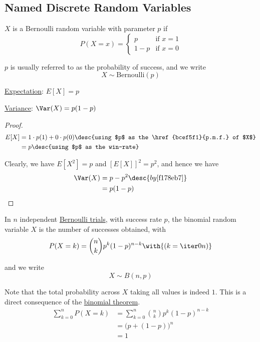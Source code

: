 \subsection{Named Discrete Random Variables}\label{ca86911}

\label{e2d50c6}

$X$ is a Bernoulli random variable with parameter $p$ if
$$
  P(X=x)=\begin{cases}
    p   & \text{if }x=1 \\
    1-p & \text{if }x=0
  \end{cases}
$$

$p$ is usually referred to as the probability of success, and we write
$$
  X\sim\mathrm{Bernoulli}(p)
$$

\label{e38c858}

\begin{enumerati}
  \item\href{ecb2162}{Expectation}: $E[X]=p$
  \item\href{ddd95d5}{Variance}: $\Var(X)=p(1-p)$
\end{enumerati}

\begin{proof}
  \begin{align*}
    E[X] &=1\cdot p(1)+0\cdot p(0)\desc{using $p$ as the \href{bcef5f1}{p.m.f.} of $X$} \\
         &=p\desc{using $p$ as the win-rate}
  \end{align*}

  Clearly, we have $E[X^2]=p$ and $[E[X]]^2=p^2$, and hence we have
  \begin{align*}
    \Var(X) &= p-p^2\desc{by \autoref{f178eb7}} \\
            &= p(1-p)
  \end{align*}
\end{proof}

\label{bc8d330}

In $n$ independent \href{e2d50c6}{Bernoulli trials}, with success rate $p$, the
binomial random variable $X$ is the number of successes obtained, with
$$
  P(X=k)=\binom nkp^k(1-p)^{n-k}\with{(k=\iter0n)}
$$

and we write
$$
  X\sim B(n,p)
$$

Note that the total probability across $X$ taking all values is indeed $1$.
This is a direct consequence of the \href{d972e65}{binomial theorem}.
\begin{align*}
  \sum_{k=0}^nP(X=k)
   &=\sum_{k=0}^n\binom nkp^k(1-p)^{n-k} \\
   &=\bigl(p+(1-p)\bigr)^n               \\
   &=1
\end{align*}


